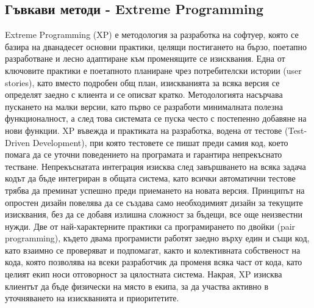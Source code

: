 \documentclass{article}
\renewcommand{\\}{\newline}
\begin{document}
\subsection{Гъвкави методи - Extreme Programming}
Extreme Programming (XP) е методология за разработка на софтуер, която се базира на дванадесет основни практики, целящи постигането на бързо, поетапно разработване и лесно адаптиране към променящите се изисквания. Една от ключовите практики е поетапното планиране чрез потребителски истории (user stories), като вместо подробен общ план, изискванията за всяка версия се определят заедно с клиента и се описват кратко. Методологията насърчава пускането на малки версии, като първо се разработи минималната полезна функционалност, а след това системата се пуска често с постепенно добавяне на нови функции. XP въвежда и практиката на разработка, водена от тестове (Test-Driven Development), при която тестовете се пишат преди самия код, което помага да се уточни поведението на програмата и гарантира непрекъснато тестване. Непрекъснатата интеграция изисква след завършването на всяка задача кодът да бъде интегриран в общата система, като всички автоматични тестове трябва да преминат успешно преди приемането на новата версия. Принципът на опростен дизайн повелява да се създава само необходимият дизайн за текущите изисквания, без да се добавя излишна сложност за бъдещи, все още неизвестни нужди. Две от най-характерните практики са програмирането по двойки (pair programming), където двама програмисти работят заедно върху един и същи код, като взаимно се проверяват и подпомагат, както и колективната собственост на кода, която позволява на всеки разработчик да променя всяка част от кода, като целият екип носи отговорност за цялостната система. Накрая, XP изисква клиентът да бъде физически на място в екипа, за да участва активно в уточняването на изискванията и приоритетите.
\end{document}
